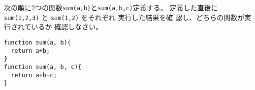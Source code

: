 \begin{Prob}\upshape
 次の順に2つの関数\texttt{sum(a,b)}と\texttt{sum(a,b,c)}定義する。
 定義した直後に \Verb+sum(1,2,3)+ と \Verb+sum(1,2)+ をそれぞれ
 実行した結果を確
 認し、どちらの関数が実行されているか 確認しなさい。
\begin{Verbatim}
function sum(a, b){
  return a+b;
}
function sum(a, b, c){
  return a+b+c;
}
\end{Verbatim}
\end{Prob}

